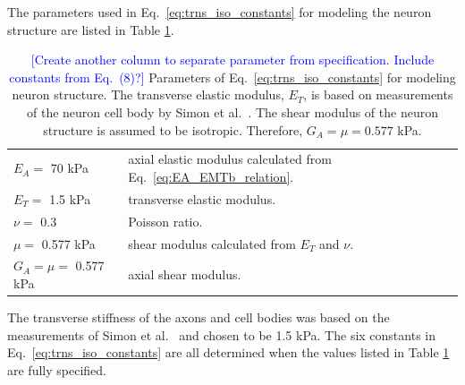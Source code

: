 \documentclass[]{interact}
\newcommand{\blue}[1]{\textcolor{blue}{[#1]}}
\begin{document}
The parameters used in Eq.\ \eqref{eq:trns_iso_constants} for modeling the neuron structure are listed in Table \ref{table:neuron_parameters}. 
\begin{table}[ht]
\begin{center}
\begin{tabular}{ l l }
\hline \hline
$E_A = $ 70 kPa  & axial elastic modulus calculated from Eq.\ \eqref{eq:EA_EMTb_relation}. \\ 
$E_T = $ 1.5 kPa & transverse elastic modulus. \\
$\nu = $ 0.3 & Poisson ratio. \\
$\mu = $ 0.577 kPa & shear modulus calculated from $E_T$ and $\nu$. \\ 
$G_A = \mu = $ 0.577 kPa & axial shear modulus.\\ \hline \hline
\end{tabular}
\end{center}
\caption{\blue{Create another column to separate parameter from specification. Include constants from Eq.\ (8)?} Parameters of Eq.\ \eqref{eq:trns_iso_constants} for modeling neuron structure. The transverse elastic modulus, $E_T$, is based on measurements of the neuron cell body by Simon et al.\ \citep{Simon:2016ig}. The shear modulus of the neuron structure is assumed to be isotropic. Therefore, $G_A = \mu = 0.577$ kPa.}
\label{table:neuron_parameters}
\end{table}
%
The transverse stiffness of the axons and cell bodies was based on the measurements of Simon et al.\ \citep{Simon:2016ig} and chosen to be 1.5 kPa. The six constants in Eq.\ \eqref{eq:trns_iso_constants} are all determined when the values listed in Table \ref{table:neuron_parameters} are fully specified.
\end{document}
